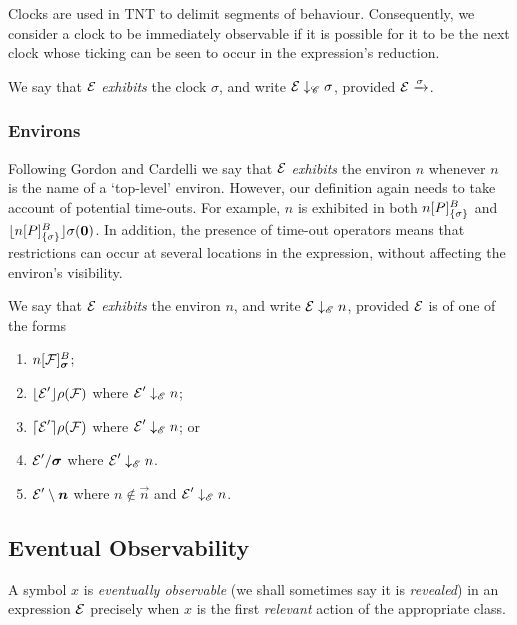 \documentclass[orivec,envcountsame]{llncs}
\newcommand{\Exhibits}[1]{\mathrel{\downarrow_{#1}}}
\newcommand{\ExhibitsC}{\Exhibits{\mathscr{C}}}
\newcommand{\ExhibitsE}{\Exhibits{\mathscr{E}}}
\newcommand{\Does}[1]{\xderives{#1}}
\begin{document}
Clocks are used in TNT to delimit segments of behaviour. Consequently, we
consider a clock to be immediately observable if it is possible for it to be the
next clock whose ticking can be seen to occur in the expression's reduction.

\begin{definition}
We say that $\text{$\mathcal{E}$}$ \emph{exhibits} the clock $\sigma$, and write $\expr \ExhibitsC \sigma$, provided $\expr \Does{\sigma}$.
\end{definition}

\subsubsection{Environs} 

Following Gordon and Cardelli \cite{GC99} we say that $\text{$\mathcal{E}$}$ \emph{exhibits}
the environ $n$ whenever $n$ is the name of a `top-level' environ. However, our
definition again needs to take account of potential time-outs. For example, $n$
is exhibited in both ${n}[ P ]^{B}_{\{\sigma\}}$ and
$\lfloor{{n}[ P ]^{B}_{\{\sigma\}}}\rfloor {\sigma} ({\textbf{0}})$. In addition, the presence of time-out operators means that restrictions can occur at several locations in the expression, without affecting the environ's visibility.

\begin{definition}
We say that $\text{$\mathcal{E}$}$ \emph{exhibits} the environ $n$, and write $\expr \ExhibitsE
n$, provided $\text{$\mathcal{E}$}$ is of one of the forms 
\begin{enumerate}
\item 
    $\locv{n}{\exprb}{B}{\vec{\sigma}}$;
\item
    $\lfloor{ \text{$\mathcal{E}$}' }\rfloor {\rho} ({\text{$\mathcal{F}$}})$ where $\expr' \ExhibitsE n$;
\item
    $\lceil{ \text{$\mathcal{E}$}' }\rceil {\rho} ({\text{$\mathcal{F}$}})$ where $\expr' \ExhibitsE n$; or
\item
    $\expr' \hide{\vec{\sigma}}$ where $\expr' \ExhibitsE n$.
\item
    $\expr' \res{ \vec{n} }$ where $n \not\in \vec{n}$ and $\expr' \ExhibitsE n$.
\end{enumerate}
\end{definition}


\subsection{Eventual Observability}
\label{sec:eventual-observability}

A symbol $x$ is \emph{eventually observable} (we shall sometimes say it is \emph{revealed}) in an expression $\text{$\mathcal{E}$}$ precisely when $x$ is the first \emph{relevant} action of the appropriate class.
\end{document}
